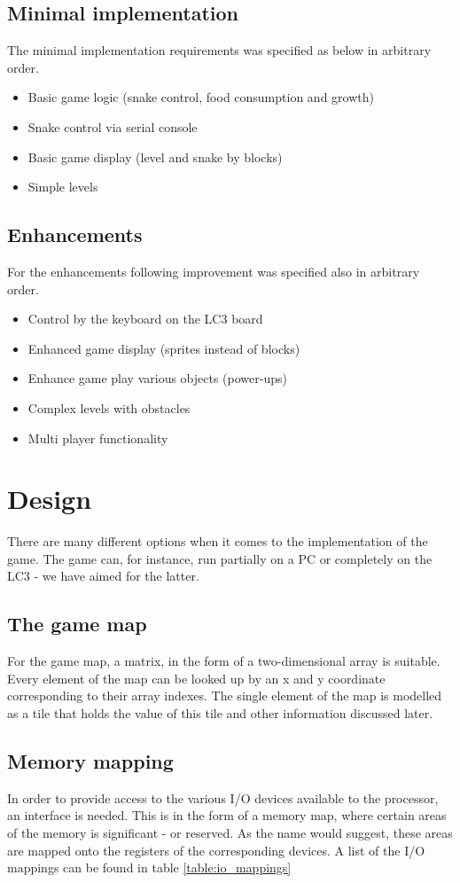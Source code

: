 \documentclass{acm_proc_article-sp}
\begin{document}
\subsection{Minimal implementation}
The minimal implementation requirements was specified as below in arbitrary order.    
\begin{itemize}
\item Basic game logic (snake control, food consumption and growth)
\item Snake control via serial console 
\item Basic game display (level and snake by blocks) 
\item Simple levels
\end{itemize}

\subsection{Enhancements}
For the enhancements following improvement was specified also in arbitrary order.
\begin{itemize}
\item Control by the keyboard on the LC3 board 
\item Enhanced game display (sprites instead of blocks) 
\item Enhance game play various objects (power-ups)  
\item Complex levels with obstacles
\item Multi player functionality 
\end{itemize}

\section{Design}
There are many different options when it comes to the implementation of the game. The game can, for instance, run partially on a PC or completely on the LC3 - we have aimed for the latter.
\subsection{The game map}
For the game map, a matrix, in the form of a two-dimensional array is suitable. Every element of the map can be looked up by an x and y coordinate corresponding to their array indexes. The single element of the map is modelled as a tile that holds the value of this tile and other information discussed later.

\subsection{Memory mapping}
In order to provide access to the various I/O devices available to the processor, an interface is needed. This is in the form of a memory map, where certain areas of the memory is significant - or reserved. As the name would suggest, these areas are mapped onto the registers of the corresponding devices. A list of the I/O mappings can be found in table \ref{table:io_mappings}
\end{document}
